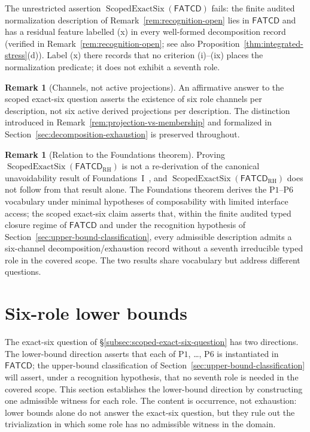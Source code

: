 \documentclass[11pt]{article}
\theoremstyle{definition}
\newtheorem{remark}[theorem]{Remark}
\newcommand{\FATCD}{\ensuremath{\mathsf{FATCD}}}
\newcommand{\ScopedExactSix}[1]{\ensuremath{\operatorname{ScopedExactSix}\!\left(#1\right)}}
\newcommand{\Pone}{\ensuremath{\mathrm{P1}}}
\newcommand{\Psix}{\ensuremath{\mathrm{P6}}}
\begin{document}
The unrestricted assertion \(\ScopedExactSix{\FATCD{}}\) fails: the finite
audited normalization description of Remark~\ref{rem:recognition-open} lies
in \FATCD{} and has a residual feature labelled (x) in every well-formed decomposition
record (verified in Remark~\ref{rem:recognition-open}; see also
Proposition~\ref{thm:integrated-stress}(d)). Label (x) there records that no
criterion (i)--(ix) places the normalization predicate; it does not exhibit a
seventh role.

\begin{remark}[Channels, not active projections]\label{rem:channel-vs-activation-reminder}
An affirmative answer to the scoped exact-six question asserts the
existence of six role channels per description, not six active derived
projections per description. The distinction introduced in
Remark~\ref{rem:projection-vs-membership} and formalized in
Section~\ref{sec:decomposition-exhaustion} is preserved throughout.
\end{remark}

\begin{remark}[Relation to the Foundations theorem]\label{rem:fatcd-foundations-relation}
Proving \(\ScopedExactSix{\FATCD_{\mathrm{RH}}}\) is not a re-derivation of the
canonical unavoidability result of Foundations~I~\citep{Tsiokos2026SixBirdsFoundations},
and \(\ScopedExactSix{\FATCD_{\mathrm{RH}}}\) does not follow from that result
alone. The Foundations theorem derives the \Pone{}--\Psix{} vocabulary
under minimal hypotheses of composability with limited interface
access; the scoped exact-six claim asserts that, within the finite
audited typed closure regime of \FATCD{} and under the recognition hypothesis of
Section~\ref{sec:upper-bound-classification}, every admissible description
admits a six-channel decomposition/exhaustion record without a seventh
irreducible typed role in the covered scope. The two results share
vocabulary but address different questions.
\end{remark}
 \section{Six-role lower bounds}\label{sec:lower-bounds}



The exact-six question of
\S\ref{subsec:scoped-exact-six-question} has two directions. The
lower-bound direction asserts that each of \Pone{}, \ldots, \Psix{}
is instantiated in \FATCD{}; the upper-bound classification of
Section~\ref{sec:upper-bound-classification} will assert, under a recognition
hypothesis, that no seventh role is needed in the covered scope. This section establishes the
lower-bound direction by constructing one admissible witness for each
role. The content is occurrence, not exhaustion: lower bounds alone
do not answer the exact-six question, but they rule out the
trivialization in which some role has no admissible witness in the
domain.
\end{document}
